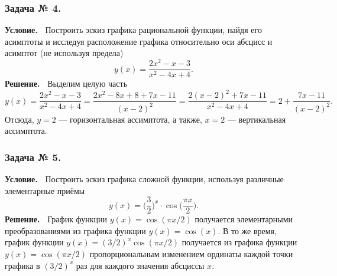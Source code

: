 \subsubsection*{\center Задача № 4.}
{\bf Условие.~}
Построить эскиз графика рациональной функции, найдя его асимптоты и исследуя 
расположение графика относительно оси абсцисс и асимптот (не используя предела)
$$
y(x) = \dfrac{2x^2-x-3}{x^2-4x+4}.
$$
{\bf Решение.~}	
Выделим целую часть
$$
y(x) = \dfrac{2x^2-x-3}{x^2-4x+4} = \dfrac{2x^2-8x+8+7x-11}{(x-2)^2} = \dfrac{2(x-2)^2+7x-11}{x^2-4x+4} =
2 + \dfrac{7x-11}{(x-2)^2} .
$$
Отсюда, $y = 2$ --- горизонтальная ассимптота, а также, $x = 2$ --- вертикальная ассимптота.
\begin{center}
\end{center}

\subsubsection*{\center Задача № 5.}
{\bf Условие.~}
Построить эскиз графика сложной функции, используя различные элементарные приёмы
$$
y(x) = \biggl(\dfrac{3}{2}\biggr)^x\cdot\cos\biggl(\dfrac{\pi x}{2}\biggr).
$$
{\bf Решение.~}	График функции $y(x)=\cos(\pi x/2)$ получается элементарными преобразованиями из
графика функции $y(x)=\cos(x)$. В то же время, график функции $y(x)=(3/2)^x\cos(\pi x/2)$ получается
из графика функции $y(x)=\cos(\pi x/2)$  пропорциональным изменением ординаты каждой точки графика в $(3/2)^x$ раз для
каждого значения абсциссы $x$.
\begin{center}
\end{center}